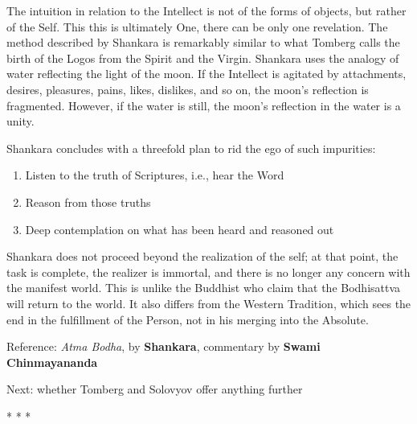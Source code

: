 The intuition in relation to the Intellect is not of the forms of objects, but rather of the Self. This this is ultimately One, there can be only one revelation. The method described by Shankara is remarkably similar to what Tomberg calls the birth of the Logos from the Spirit and the Virgin. Shankara uses the analogy of water reflecting the light of the moon. If the Intellect is agitated by attachments, desires, pleasures, pains, likes, dislikes, and so on, the moon's reflection is fragmented. However, if the water is still, the moon's reflection in the water is a unity.

Shankara concludes with a threefold plan to rid the ego of such impurities:

\begin{enumerate}


\item Listen to the truth of Scriptures, i.e., hear the Word

\item Reason from those truths

\item Deep contemplation on what has been heard and reasoned out
\end{enumerate}


Shankara does not proceed beyond the realization of the self; at that point, the task is complete, the realizer is immortal, and there is no longer any concern with the manifest world. This is unlike the Buddhist who claim that the Bodhisattva will return to the world. It also differs from the Western Tradition, which sees the end in the fulfillment of the Person, not in his merging into the Absolute.

Reference: \emph{Atma Bodha}, by \textbf{Shankara}, commentary by \textbf{Swami Chinmayananda}


Next: whether Tomberg and Solovyov offer anything further



\begin{center}* * *\end{center}

